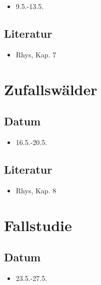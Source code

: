 \documentclass[
]{book}
\providecommand{\tightlist}{%
  \setlength{\itemsep}{0pt}\setlength{\parskip}{0pt}}
\begin{document}
\begin{itemize}
\tightlist
\item
  9.5.-13.5.
\end{itemize}

\hypertarget{literatur-8}{%
\subsection{Literatur}\label{literatur-8}}

\begin{itemize}
\tightlist
\item
  Rhys, Kap. 7
\end{itemize}

\hypertarget{zufallswuxe4lder}{%
\section{Zufallswälder}\label{zufallswuxe4lder}}

\hypertarget{datum-9}{%
\subsection{Datum}\label{datum-9}}

\begin{itemize}
\tightlist
\item
  16.5.-20.5.
\end{itemize}

\hypertarget{literatur-9}{%
\subsection{Literatur}\label{literatur-9}}

\begin{itemize}
\tightlist
\item
  Rhys, Kap. 8
\end{itemize}

\hypertarget{fallstudie}{%
\section{Fallstudie}\label{fallstudie}}

\hypertarget{datum-10}{%
\subsection{Datum}\label{datum-10}}

\begin{itemize}
\tightlist
\item
  23.5.-27.5.
\end{itemize}
\end{document}
